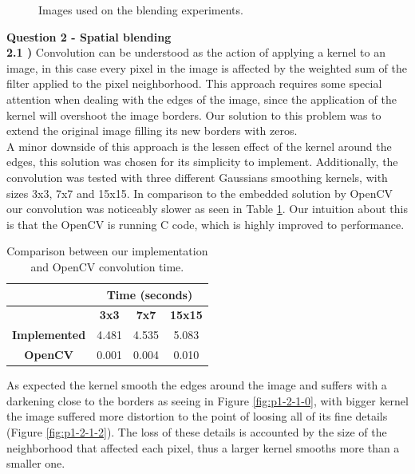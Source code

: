 \documentclass[12pt,a4paper]{article}
\begin{document}
\begin{figure}[!h]
{{		}
	}
	\caption{Images used on the blending experiments.}
	\label{fig:blending}
\end{figure}
	
\textbf{\LARGE Question 2 - Spatial blending}\\

\textbf{2.1 )} Convolution can be understood as the action of applying a kernel to an image, in this case every pixel in the image is affected by the weighted sum of the filter applied to the pixel neighborhood. This approach requires some special attention when dealing with the edges of the image, since the application of the kernel will overshoot the image borders. Our solution to this problem was to extend the original image filling its new borders with zeros. \\

A minor downside of this approach is the lessen effect of the kernel around the edges, this solution was chosen for its simplicity to implement. Additionally, the convolution was tested with three different Gaussians smoothing kernels, with sizes 3x3, 7x7 and 15x15. In comparison to the embedded solution by OpenCV our convolution was noticeably slower as seen in Table \ref{table:convolution-opencv}. Our intuition about this is that the OpenCV is running C code, which is highly improved to performance. \\ 

\begin{table}[!h]
	\centering
	\begin{tabular}{|c|c|c|c|}
		\hline
		& \multicolumn{3}{c|}{\textbf{Time (seconds)}} \\ \hline
		\backslashbox{\textbf{Convolution}}{\textbf{Kernel Size}}    & \textbf{3x3}         & \textbf{7x7}          & \textbf{15x15}      \\ \hline
		\textbf{Implemented}  & 4.481      & 4.535      & 5.083     \\ \hline
		\textbf{OpenCV} & 0.001      & 0.004       & 0.010     \\ \hline
	\end{tabular}
	\caption{Comparison between our implementation and OpenCV convolution time.}
	\label{table:convolution-opencv}
\end{table}

As expected the kernel smooth the edges around the image and suffers with a darkening close to the borders as seeing in Figure \ref{fig:p1-2-1-0}, with bigger kernel the image suffered more distortion to the point of loosing all of its fine details (Figure \ref{fig:p1-2-1-2}). The loss of these details is accounted by the size of the neighborhood that affected each pixel, thus a larger kernel smooths more than a smaller one. \\
\end{document}
